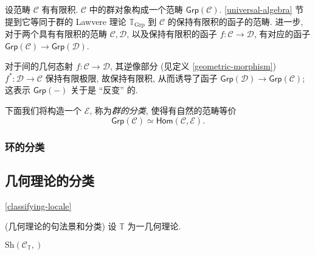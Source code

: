 
设范畴 $\mathcal C$ 有有限积. $\mathcal C$ 中的群对象构成一个范畴 $\mathsf {Grp}(\mathcal C)$.
\ref{universal-algebra} 节提到它等同于群的 Lawvere 理论 $\mathbb T_{\text{Grp}}$ 到 $\mathcal C$ 的保持有限积的函子的范畴.
进一步, 对于两个具有有限积的范畴 $\mathcal C,\mathcal D$, 以及保持有限积的函子 $f \colon \mathcal C \to \mathcal D$, 有对应的函子
$\mathsf {Grp}(\mathcal C) \to \mathsf {Grp}(\mathcal D)$.%

对于\topos{}间的几何态射 $f \colon \mathcal C \to \mathcal D$, 其逆像部分 (见定义 \ref{geometric-morphism}) $f^* \colon \mathcal D \to \mathcal C$ 保持有限极限, 故保持有限积, 从而诱导了函子 $\mathsf {Grp}(\mathcal D) \to \mathsf {Grp}(\mathcal C)$;
这表示 $\mathsf {Grp}(-)$ 关于\topos{}是 ``反变'' 的.

下面我们将构造一个\topos{} $\mathcal E$, 称为\emph{群的分类\topos{}}, 使得有自然的范畴等价
$$
\mathsf {Grp}(\mathcal C) \simeq \mathsf{Hom}(\mathcal C,\mathcal E).
$$

\subsubsection{环的分类\topos{}}



%
%
%

\subsection{几何理论的分类\topos{}}

\ref{classifying-locale}

\begin{definition}
    {(几何理论的句法景和分类\topos{})}
    设 $\mathbb T$ 为一几何理论.
    
    $\text{Sh}(\mathcal C_{\mathbb T},)$
\end{definition}

